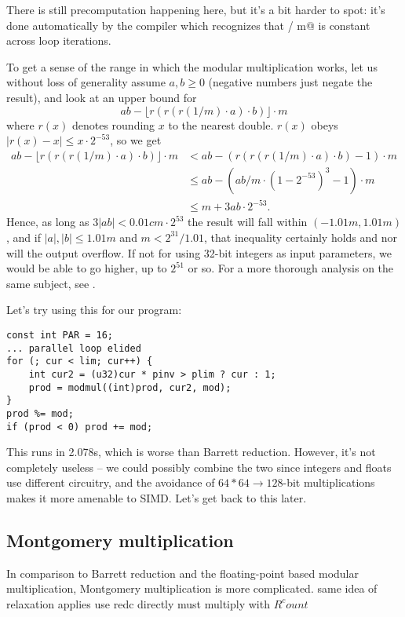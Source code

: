 \documentclass[openany]{book}
\begin{document}
There is still precomputation happening here, but it's a bit harder to spot: it's done automatically by the compiler which recognizes that  / m@ is constant across loop iterations.

To get a sense of the range in which the modular multiplication works, let us without loss of generality assume $a,b \ge 0$ (negative numbers just negate the result), and look at an upper bound for
\[ ab - \lfloor r(r(r(1/m)\cdot a)\cdot b)\rfloor \cdot m \]
where $r(x)$ denotes rounding $x$ to the nearest double.
$r(x)$ obeys $|r(x) - x| \le x \cdot 2^{-53}$, so we get
\begin{align*}
ab - \lfloor r(r(r(1/m)\cdot a)\cdot b)\rfloor \cdot m
&< ab - (r(r(r(1/m)\cdot a)\cdot b) - 1) \cdot m \\
&\le ab - (ab/m \cdot (1 - 2^{-53})^3 - 1) \cdot m \\
&\le m + 3ab \cdot 2^{-53}.
\end{align*}
Hence, as long as $3|ab| < 0.01 c m \cdot 2^{53}$ the result will fall within $(-1.01m, 1.01m)$, and if $|a|,|b| \le 1.01 m$ and $m < 2^{31} / 1.01$, that inequality certainly holds and nor will the output overflow. If not for using 32-bit integers as input parameters, we would be able to go higher, up to $2^{51}$ or so. For a more thorough analysis on the same subject, see \cite{modmulproof}.

Let's try using this for our program:

\begin{lstlisting}
const int PAR = 16;
... parallel loop elided
for (; cur < lim; cur++) {
	int cur2 = (u32)cur * pinv > plim ? cur : 1;
	prod = modmul((int)prod, cur2, mod);
}
prod %= mod;
if (prod < 0) prod += mod;
\end{lstlisting}

This runs in 2.078s, which is worse than Barrett reduction. However, it's not completely useless -- we could possibly combine the two since integers and floats use different circuitry, and the avoidance of \mbox{$64*64\rightarrow128$}-bit multiplications makes it more amenable to SIMD. Let's get back to this later.

\subsection*{Montgomery multiplication}

In comparison to Barrett reduction and the floating-point based modular multiplication, Montgomery multiplication is more complicated.
same idea of relaxation applies
use redc directly
must multiply with $R^count$
\end{document}
